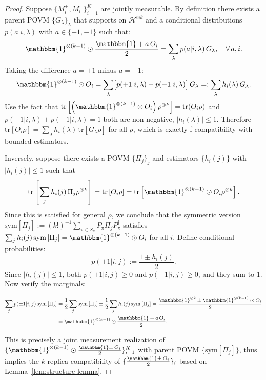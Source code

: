 \documentclass[aps,%
twocolumn,%
floatfix,%
pra,%
amsfonts,%
groupedaddress,%
superscriptaddress]{revtex4-2}%
\newcommand{\1}{\mathbbm{1}}
\begin{document}
\begin{proof}
Suppose $\{M_i^+, M_i^-\}_{i=1}^K$ are jointly measurable. By definition there exists a parent POVM $\{G_\lambda\}_\lambda$ that supports on $\mathcal{H}^{\otimes k}$ and a conditional distributions $p(a|i,\lambda)$ with $a \in \{+1,-1\}$ such that:
\begin{align}
\1^{\otimes(k-1)}\odot \frac{\1 + a\, O_i}{2} = \sum_\lambda p(a|i,\lambda)\, G_\lambda, \quad \forall\, a, i.
\end{align}
Taking the difference $a=+1$ minus $a=-1$:
\begin{align}
    \1^{\otimes(k-1)}\odot  O_i = \sum_\lambda \bigl[p(+1|i,\lambda) - p(-1|i,\lambda)\bigr]\, G_\lambda =: \sum_\lambda h_i(\lambda)\, G_\lambda.
\end{align}
Use the fact that $\mathrm{tr}\left[\left(\1^{\otimes(k-1)}\odot O_i\right) \rho^{\otimes k} \right]= \mathrm{tr}(O_i \rho)$ and $p(+1|i,\lambda) + p(-1|i,\lambda) = 1$ both are non-negative, $|h_i(\lambda)| \leq 1$.
 Therefore $\mathrm{tr}[O_i\rho] = \sum_\lambda h_i(\lambda)\,\mathrm{tr}[G_\lambda\rho]$ for all $\rho$, which is exactly f-compatibility with bounded estimators.

Inversely, suppose there exists a POVM $\{\Pi_j\}_j$ and estimators $\{h_i(j)\}$ with $|h_i(j)| \leq 1$ such that
\begin{align}
     \mathrm{tr}\left[ \sum_j h_i(j)\,\Pi_j \rho^{\otimes k}\right] = \mathrm{tr}\left[ O_i \rho \right] = \mathrm{tr}\left[ \1^{\otimes(k-1)}\odot  O_i \rho^{\otimes k} \right] .
\end{align}
Since this is satisfied for general $\rho$, we conclude that the symmetric version $\mathrm{sym}\left[\Pi_j\right] := (k!)^{-1}\sum_{\pi \in S_k} P_{\pi}\Pi_j P_{\pi}^\dagger$ satisfies $\sum_j h_i(j)\,\mathrm{sym}\left[\Pi_j\right] =\1^{\otimes(k-1)}\odot O_i$ for all $i$.
Define conditional probabilities:
$$
p(\pm 1|i,j) := \frac{1 \pm h_i(j)}{2}.
$$
Since $|h_i(j)|\leq 1$, both $p(+1|i,j) \geq 0$ and $p(-1|i,j) \geq 0$, and they sum to 1. Now verify the marginals:

\begin{align}
\sum_j p(\pm 1|i,j)\,\mathrm{sym}\left[\Pi_j\right] &= \frac{1}{2}\sum_j \mathrm{sym}\left[\Pi_j\right] \pm \frac{1}{2}\sum_j h_i(j)\,\mathrm{sym}\left[\Pi_j\right]  = \frac{\1^{\otimes k} \pm \1^{\otimes(k-1)}\odot O_i}{2}\\
&=\1^{\otimes(k-1)}\odot \frac{\1 + a\, O_i}{2}.
\end{align}

This is precisely a joint measurement realization of $\{\1^{\otimes(k-1)}\odot \frac{\1 \pm \, O_i}{2}\}_{i=1}^K$ with parent POVM $\{\mathrm{sym}\left[\Pi_j\right]\}$, thus implies the $k$-replica compatibility of $\{\frac{\1 \pm \, O_i}{2}\}_i$ based on Lemma~\ref{lem:structure-lemma}.
\end{proof}
\end{document}
